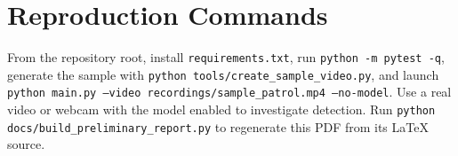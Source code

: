 \documentclass[conference,10pt]{IEEEtran}
\begin{document}
\section{Reproduction Commands}
From the repository root, install \texttt{requirements.txt}, run \texttt{python -m pytest -q}, generate the sample with \texttt{python tools/create\_sample\_video.py}, and launch \texttt{python main.py --video recordings/sample\_patrol.mp4 --no-model}. Use a real video or webcam with the model enabled to investigate detection. Run \texttt{python docs/build\_preliminary\_report.py} to regenerate this PDF from its \LaTeX{} source.
\end{document}
